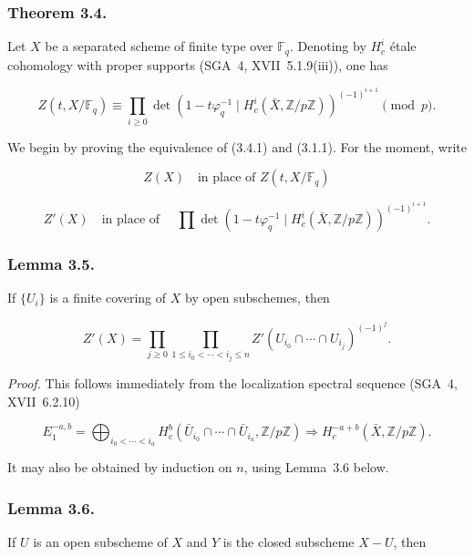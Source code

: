 \subsubsection*{Theorem 3.4.}
Let $X$ be a separated scheme of finite type over $\mathbb F_q$. Denoting by
$H_c^i$ étale cohomology with proper supports (SGA~4, XVII~5.1.9(iii)), one
has

\begin{equation}\tag{3.4.1}
Z(t,X/\mathbb F_q)
\equiv
\prod_{i\geq0}
\det\!\left(1-t\varphi_q^{-1}\mid
H_c^i(\bar X,\mathbb Z/p\mathbb Z)\right)^{(-1)^{i+1}}
\pmod p.
\end{equation}

We begin by proving the equivalence of (3.4.1) and (3.1.1). For the moment,
write

\begin{equation}\tag{3.4.2}
Z(X)\quad\text{in place of }Z(t,X/\mathbb F_q)
\end{equation}

\begin{equation}\tag{3.4.3}
Z'(X)\quad\text{in place of }\quad
\prod\det\!\left(1-t\varphi_q^{-1}\mid
H_c^i(\bar X,\mathbb Z/p\mathbb Z)\right)^{(-1)^{i+1}}.
\end{equation}

\subsubsection*{Lemma 3.5.}
If $\{U_i\}$ is a finite covering of $X$ by open subschemes, then

\begin{equation}\tag{3.5.1}
Z'(X)=
\prod_{j\geq0}
\prod_{1\leq i_0<\cdots<i_j\leq n}
Z'(U_{i_0}\cap\cdots\cap U_{i_j})^{(-1)^j}.
\end{equation}

\medskip
\noindent\emph{Proof.}
This follows immediately from the localization spectral sequence (SGA~4,
XVII~6.2.10)

\[
E_1^{-a,b}=\bigoplus_{i_0<\cdots<i_a}
H_c^b(\bar U_{i_0}\cap\cdots\cap\bar U_{i_a},\mathbb Z/p\mathbb Z)
\Longrightarrow H_c^{-a+b}(\bar X,\mathbb Z/p\mathbb Z).
\]

It may also be obtained by induction on $n$, using Lemma~3.6 below.

\subsubsection*{Lemma 3.6.}
If $U$ is an open subscheme of $X$ and $Y$ is the closed subscheme $X-U$, then

